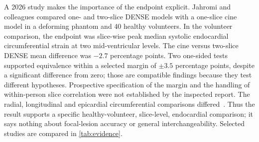 A 2026 study makes the importance of the endpoint explicit. Jahromi and colleagues compared one- and two-slice DENSE models with a one-slice cine model in a deforming phantom and 40 healthy volunteers. In the volunteer comparison, the endpoint was slice-wise peak median systolic endocardial circumferential strain at two mid-ventricular levels. The cine versus two-slice DENSE mean difference was \(-2.7\) percentage points. Two one-sided tests supported equivalence within a selected margin of \(\pm3.5\) percentage points, despite a significant difference from zero; those are compatible findings because they test different hypotheses. Prospective specification of the margin and the handling of within-person slice correlation were not established by the inspected report. The radial, longitudinal and epicardial circumferential comparisons differed~\cite{jahromi2026densecine}. Thus the result supports a specific healthy-volunteer, slice-level, endocardial comparison; it says nothing about focal-lesion accuracy or general interchangeability. Selected studies are compared in \cref{tab:evidence}.

